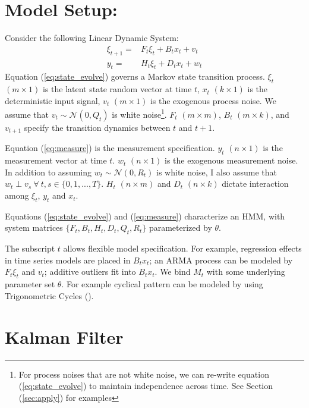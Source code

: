 \documentclass[10pt]{article}
\numberwithin{equation}{section}
\begin{document}
\section{Model Setup:} \label{sec:model_setup}
Consider the following Linear Dynamic System:
\begin{align}
    \xi_{t+1} = & F_{t}\xi_{t} + B_{t}x_t + v_t \label{eq:state_evolve} \\
    y_t = & H_t\xi_{t} + D_{t}x_t + w_t \label{eq:measure}
\end{align}
Equation (\ref{eq:state_evolve}) governs a Markov state transition process. $\xi_t$ $(m\times 1)$ is the latent state random vector at time $t$, $x_t$ $(k\times 1)$ is the deterministic input signal, $v_t$ $(m\times 1)$ is the exogenous process noise. We assume that $v_t\sim \mathcal{N}(0,Q_t)$ is white noise\footnote{For process noises that are not white noise, we can re-write equation (\ref{eq:state_evolve}) to maintain independence across time. See Section (\ref{sec:apply}) for examples}. $F_t$ $(m\times m)$, $B_t$ $(m\times k)$, and $v_{t+1}$ specify the transition dynamics between $t$ and $t+1$. 

Equation (\ref{eq:measure}) is the measurement specification. $y_t$ $(n\times 1)$ is the measurement vector at time $t$. $w_t$ $(n\times 1)$ is the exogenous measurement noise. In addition to assuming $w_t\sim \mathcal{N}(0, R_t)$ is white noise, I also assume that  $w_t \perp v_s \ \forall\  t,s\in\{0,1,...,T\}$. $H_t$ $(n\times m)$ and $D_t$ $(n\times k)$ dictate interaction among $\xi_t$, $y_t$ and $x_t$. 

Equations (\ref{eq:state_evolve}) and (\ref{eq:measure}) characterize an HMM, with system matrices $\{F_t, B_t, H_t, D_t, Q_t, R_t\}$ parameterized by $\theta$.

The subscript $t$ allows flexible model specification. For example, regression effects in time series models are placed in $B_t x_t$; an ARMA process can be modeled by $F_t\xi_t$ and $v_t$; additive outliers fit into $B_t x_t$. We bind $M_t$ with some underlying parameter set $\theta$. For example cyclical pattern can be modeled by using Trigonometric Cycles (\cite{harvey_1985}).  

\section{Kalman Filter} \label{sec:filter}
\end{document}
